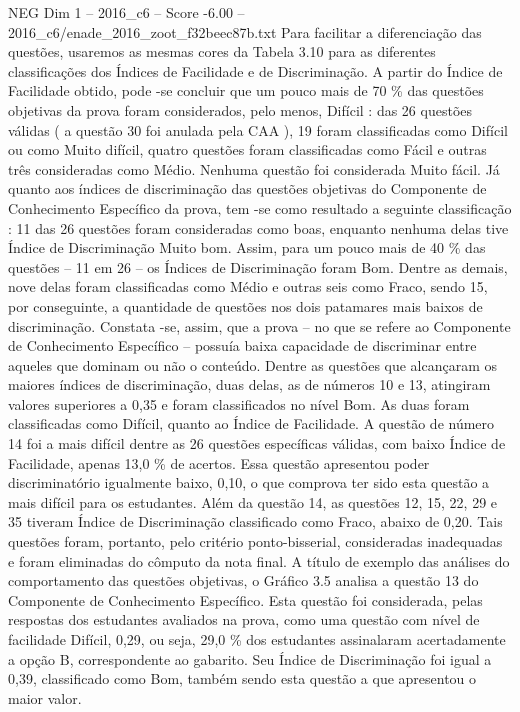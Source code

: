 \begin{textsample}{NEG Dim 1 – 2016\_c6 – Score -6.00 – 2016\_c6/enade\_2016\_zoot\_f32beec87b.txt}
Para facilitar a diferenciação das questões, usaremos as mesmas cores da Tabela 3.10 para as diferentes classificações dos Índices de Facilidade e de Discriminação.
A partir do Índice de Facilidade obtido, pode -se concluir que um pouco mais de 70 \% das questões objetivas da prova foram considerados, pelo menos, Difícil : das 26 questões válidas ( a questão 30 foi anulada pela CAA ), 19 foram classificadas como Difícil ou como Muito difícil, quatro questões foram classificadas como Fácil e outras três consideradas como Médio.
Nenhuma questão foi considerada Muito fácil.
Já quanto aos índices de discriminação das questões objetivas do Componente de Conhecimento Específico da prova, tem -se como resultado a seguinte classificação : 11 das 26 questões foram consideradas como boas, enquanto nenhuma delas tive Índice de Discriminação Muito bom.
Assim, para um pouco mais de 40 \% das questões – 11 em 26 – os Índices de Discriminação foram Bom.
Dentre as demais, nove delas foram classificadas como Médio e outras seis como Fraco, sendo 15, por conseguinte, a quantidade de questões nos dois patamares mais baixos de discriminação.
Constata -se, assim, que a prova – no que se refere ao Componente de Conhecimento Específico – possuía baixa capacidade de discriminar entre aqueles que dominam ou não o conteúdo.
Dentre as questões que alcançaram os maiores índices de discriminação, duas delas, as de números 10 e 13, atingiram valores superiores a 0,35 e foram classificados no nível Bom.
As duas foram classificadas como Difícil, quanto ao Índice de Facilidade.
A questão de número 14 foi a mais difícil dentre as 26 questões específicas válidas, com baixo Índice de Facilidade, apenas 13,0 \% de acertos.
Essa questão apresentou poder discriminatório igualmente baixo, 0,10, o que comprova ter sido esta questão a mais difícil para os estudantes.
Além da questão 14, as questões 12, 15, 22, 29 e 35 tiveram Índice de Discriminação classificado como Fraco, abaixo de 0,20.
Tais questões foram, portanto, pelo critério ponto-bisserial, consideradas inadequadas e foram eliminadas do cômputo da nota final.
A título de exemplo das análises do comportamento das questões objetivas, o Gráfico 3.5 analisa a questão 13 do Componente de Conhecimento Específico.
Esta questão foi considerada, pelas respostas dos estudantes avaliados na prova, como uma questão com nível de facilidade Difícil, 0,29, ou seja, 29,0 \% dos estudantes assinalaram acertadamente a opção B, correspondente ao gabarito.
Seu Índice de Discriminação foi igual a 0,39, classificado como Bom, também sendo esta questão a que apresentou o maior valor.

\end{textsample}
